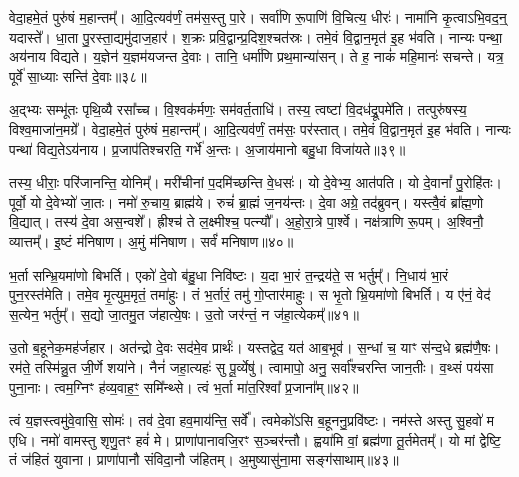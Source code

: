 वेदा॒हमे॒तं पुरु॑षं म॒हान्तम्᳚। 
आ॒दि॒त्यव॑र्णं॒ तम॑स॒स्तु पा॒रे। 
सर्वा॑णि रू॒पाणि॑ वि॒चित्य॒ धीरः॑। 
नामा॑नि कृ॒त्वाऽभि॒वद॒न्॒ यदास्ते᳚। 
धा॒ता पु॒रस्ता॒द्यमु॑दाज॒हार॑। 
श॒क्रः प्रवि॒द्वान्प्र॒दिश॒श्चत॑स्रः। 
तमे॒वं वि॒द्वान॒मृत॑ इ॒ह भ॑वति। 
नान्यः पन्था॒ अय॑नाय विद्यते। 
य॒ज्ञेन॑ य॒ज्ञम॑यजन्त दे॒वाः। 
तानि॒ धर्मा॑णि प्रथ॒मान्या॑सन्। 
ते ह॒ नाकं॑ महि॒मानः॑ सचन्ते। 
यत्र॒ पूर्वे॑ सा॒ध्याः सन्ति॑ दे॒वाः॥३८॥

अ॒द्भ्यः सम्भू॑तः पृथि॒व्यै रसा᳚च्च। 
वि॒श्वक॑र्मणः॒ सम॑वर्त॒ताधि॑। 
तस्य॒ त्वष्टा॑ वि॒दध॑द्रू॒पमे॑ति। 
तत्पुरु॑षस्य॒ विश्व॒माजा॑न॒मग्रे᳚। 
वेदा॒हमे॒तं पुरु॑षं म॒हान्तम्᳚। 
आ॒दि॒त्यव॑र्णं॒ तम॑सः॒ पर॑स्तात्। 
तमे॒वं वि॒द्वान॒मृत॑ इ॒ह भ॑वति। 
नान्यः पन्था॑ विद्य॒तेऽय॑नाय। 
प्र॒जाप॑तिश्चरति॒ गर्भे॑ अ॒न्तः। 
अ॒जाय॑मानो बहु॒धा विजा॑यते॥३९॥

तस्य॒ धीराः॒ परि॑जानन्ति॒ योनिम्᳚। 
मरी॑चीनां प॒दमि॑च्छन्ति वे॒धसः॑। 
यो दे॒वेभ्य॒ आत॑पति। 
यो दे॒वानां᳚ पु॒रोहि॑तः। 
पूर्वो॒ यो दे॒वेभ्यो॑ जा॒तः। 
नमो॑ रु॒चाय॒ ब्राह्म॑ये। 
रुचं॑ ब्रा॒ह्मं ज॒नय॑न्तः। 
दे॒वा अग्रे॒ तद॑ब्रुवन्। 
यस्त्वै॒वं ब्रा᳚ह्म॒णो वि॒द्यात्। 
तस्य॑ दे॒वा अस॒न्वशे᳚। 
ह्रीश्च॑ ते ल॒क्ष्मीश्च॒ पत्न्यौ᳚। 
अ॒हो॒रा॒त्रे पा॒र्श्वे। 
नक्ष॑त्राणि रू॒पम्। 
अ॒श्विनौ॒ व्यात्तम्᳚। 
इ॒ष्टं म॑निषाण। 
अ॒मुं म॑निषाण। 
सर्वं॑ मनिषाण॥४०॥
\anuvakamend[जा॒य॒ते॒ वशे॑ स॒प्त च॑]

भ॒र्ता सन्भ्रि॒यमा॑णो बिभर्ति। 
एको॑ दे॒वो ब॑हु॒धा निवि॑ष्टः। 
य॒दा भा॒रं त॒न्द्रय॑ते॒ स भर्तुम्᳚। 
नि॒धाय॑ भा॒रं पुन॒रस्त॑मेति। 
तमे॒व मृ॒त्युम॒मृतं॒ तमा॑हुः। 
तं भ॒र्तारं॒ तमु॑ गो॒प्तार॑माहुः। 
स भृ॒तो भ्रि॒यमा॑णो बिभर्ति। 
य ए॑नं॒ वेद॑ स॒त्येन॒ भर्तुम्᳚। 
स॒द्यो जा॒तमु॒त ज॑हात्ये॒षः। 
उ॒तो जर॑न्तं॒ न ज॑हा॒त्येकम्᳚॥४१॥

उ॒तो ब॒हूनेक॒मह॑र्जहार। 
अत॑न्द्रो दे॒वः सद॑मे॒व प्रार्थः॑। 
यस्तद्वेद॒ यत॑ आब॒भूव॑। 
स॒न्धां च॒ याꣳ स॑न्द॒धे ब्रह्म॑णै॒षः। 
रम॑ते॒ तस्मि॑न्नु॒त जी॒र्णे शया॑ने। 
नैनं॑ जहा॒त्यहः॑ सु पू॒र्व्येषु॑। 
त्वामापो॒ अनु॒ सर्वा᳚श्चरन्ति जान॒तीः। 
व॒थ्सं पय॑सा पुना॒नाः। 
त्वम॒ग्निꣳ ह॑व्य॒वाह॒ꣳ॒ समि᳚न्थ्से। 
त्वं भ॒र्ता मा॑त॒रिश्वा᳚ प्र॒जाना᳚म्॥४२॥

त्वं य॒ज्ञस्त्वमु॑वे॒वासि॒ सोमः॑। 
तव॑ दे॒वा हव॒माय॑न्ति॒ सर्वे᳚। 
त्वमेको॑ऽसि ब॒हूननु॒प्रवि॑ष्टः। 
नम॑स्ते अस्तु सु॒हवो॑ म एधि। 
नमो॑ वामस्तु शृणु॒तꣳ हवं॑ मे। 
प्राणा॑पानावजि॒रꣳ स॒ञ्चर॑न्तौ। 
ह्वया॑मि वां॒ ब्रह्म॑णा तू॒र्तमेतम्᳚। 
यो मां द्वेेष्टि॒ तं ज॑हितं युवाना। 
प्राणा॑पानौ संविदा॒नौ ज॑हितम्। 
अ॒मुष्यासु॑ना॒मा सङ्ग॑साथाम्॥४३॥

